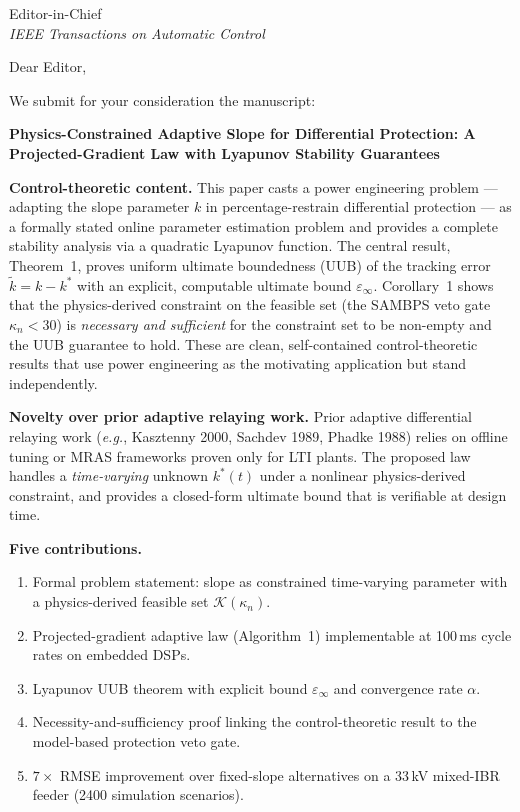 \documentclass[11pt,a4paper]{letter}
\begin{document}
\begin{letter}{Editor-in-Chief\\
               \textit{IEEE Transactions on Automatic Control}}

\opening{Dear Editor,}

We submit for your consideration the manuscript:

\begin{center}
  \textbf{Physics-Constrained Adaptive Slope for Differential
  Protection: A Projected-Gradient Law with Lyapunov Stability
  Guarantees}
\end{center}

\textbf{Control-theoretic content.}
This paper casts a power engineering problem --- adapting the slope
parameter $k$ in percentage-restrain differential protection --- as a
formally stated online parameter estimation problem and provides a
complete stability analysis via a quadratic Lyapunov function.
The central result, Theorem~1, proves uniform ultimate boundedness (UUB)
of the tracking error $\tilde{k} = k - k^*$ with an explicit,
computable ultimate bound $\varepsilon_\infty$.  Corollary~1 shows
that the physics-derived constraint on the feasible set (the SAMBPS
veto gate $\kappa_n < 30$) is \emph{necessary and sufficient} for
the constraint set to be non-empty and the UUB guarantee to hold.
These are clean, self-contained control-theoretic results that use
power engineering as the motivating application but stand independently.

\textbf{Novelty over prior adaptive relaying work.}
Prior adaptive differential relaying work (\textit{e.g.}, Kasztenny
2000, Sachdev 1989, Phadke 1988) relies on offline tuning or MRAS
frameworks proven only for LTI plants.  The proposed law handles a
\emph{time-varying} unknown $k^*(t)$ under a nonlinear
physics-derived constraint, and provides a closed-form ultimate bound
that is verifiable at design time.

\textbf{Five contributions.}
\begin{enumerate}
  \item Formal problem statement: slope as constrained time-varying
        parameter with a physics-derived feasible set $\mathcal{K}(\kappa_n)$.
  \item Projected-gradient adaptive law (Algorithm~1) implementable
        at 100\,ms cycle rates on embedded DSPs.
  \item Lyapunov UUB theorem with explicit bound
        $\varepsilon_\infty$ and convergence rate $\alpha$.
  \item Necessity-and-sufficiency proof linking the control-theoretic
        result to the model-based protection veto gate.
  \item $7\times$ RMSE improvement over fixed-slope alternatives on a
        33\,kV mixed-IBR feeder (2400 simulation scenarios).
\end{enumerate}


\end{letter}
\end{document}
